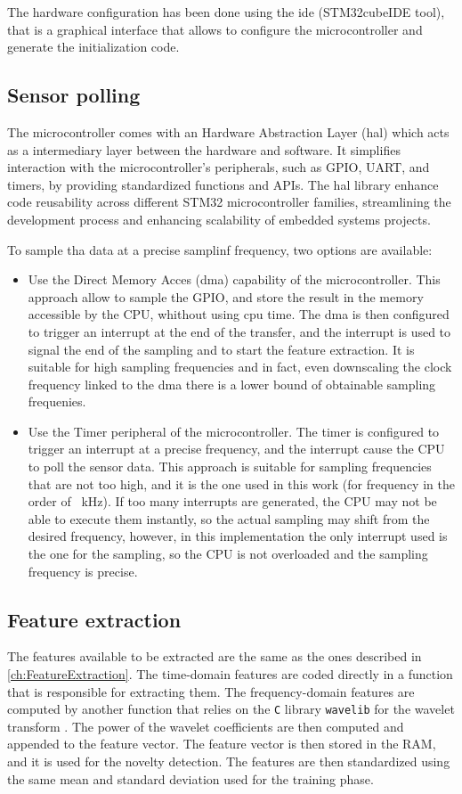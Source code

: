 The hardware configuration has been done using the \gls{ide} ({STM32cubeIDE} tool), that is a graphical interface that allows to configure the microcontroller and generate the initialization code. 

\subsection{Sensor polling}
The microcontroller comes with an Hardware Abstraction Layer (\gls{hal}) which acts as a intermediary layer between the hardware and software. It simplifies interaction with the microcontroller's peripherals, such as GPIO, UART, and timers, by providing standardized functions and APIs. The \gls{hal} library enhance code reusability across different STM32 microcontroller families, streamlining the development process and enhancing scalability of embedded systems projects.

To sample tha data at a precise samplinf frequency, two options are available:
\begin{itemize}
    \item Use the Direct Memory Acces (\gls{dma}) capability of the microcontroller. This approach allow to sample the GPIO, and store the result in the memory accessible by the CPU, whithout using cpu time. The \gls{dma} is then configured to trigger an interrupt at the end of the transfer, and the interrupt is used to signal the end of the sampling and to start the feature extraction. It is suitable for high sampling frequencies and in fact, even downscaling the clock frequency linked to the \gls{dma} there is a lower bound of obtainable sampling frequenies.
    \item Use the Timer peripheral of the microcontroller. The timer is configured to trigger an interrupt at a precise frequency, and the interrupt cause the CPU to poll the sensor data. This approach is suitable for sampling frequencies that are not too high, and it is the one used in this work (for frequency in the order of \SI{ }{\kilo\hertz}).
    If too many interrupts are generated, the CPU may not be able to execute them instantly, so the actual sampling may shift from the desired frequency, however, in this implementation the only interrupt used is the one for the sampling, so the CPU is not overloaded and the sampling frequency is precise.
\end{itemize}


\subsection{Feature extraction}
The features available to be extracted are the same as the ones described in \autoref{ch:FeatureExtraction}. The time-domain features are coded directly in a function that is responsible for extracting them. The frequency-domain features are computed by another function that relies on the \texttt{C} library \texttt{wavelib} for the wavelet transform \cite{wavelib}. The power of the wavelet coefficients are then computed and appended to the feature vector. The feature vector is then stored in the RAM, and it is used for the novelty detection.
The features are then standardized using the same mean and standard deviation used for the training phase. 

